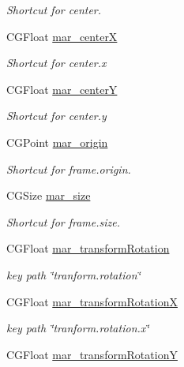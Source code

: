\begin{DoxyCompactItemize}
\begin{DoxyCompactList}\small\item\em Shortcut for center. \end{DoxyCompactList}\item 
C\+G\+Float \hyperlink{category_c_a_layer_07_m_a_r_e_x_08_a261ba297c811f16fe65b93b3bc4608a6}{mar\+\_\+centerX}
\begin{DoxyCompactList}\small\item\em Shortcut for center.\+x \end{DoxyCompactList}\item 
C\+G\+Float \hyperlink{category_c_a_layer_07_m_a_r_e_x_08_a0faae21d9b9cc323a0e0429fefb61539}{mar\+\_\+centerY}
\begin{DoxyCompactList}\small\item\em Shortcut for center.\+y \end{DoxyCompactList}\item 
C\+G\+Point \hyperlink{category_c_a_layer_07_m_a_r_e_x_08_a258dae76239e37400e6ff82cd06aa37a}{mar\+\_\+origin}
\begin{DoxyCompactList}\small\item\em Shortcut for frame.\+origin. \end{DoxyCompactList}\item 
C\+G\+Size \hyperlink{category_c_a_layer_07_m_a_r_e_x_08_a0c9bb9818b9801d38475ff7c0c75044a}{mar\+\_\+size}
\begin{DoxyCompactList}\small\item\em Shortcut for frame.\+size. \end{DoxyCompactList}\item 
C\+G\+Float \hyperlink{category_c_a_layer_07_m_a_r_e_x_08_a4ba4db24b6cb4a922561e311c41a94f2}{mar\+\_\+transform\+Rotation}
\begin{DoxyCompactList}\small\item\em key path \char`\"{}tranform.\+rotation\char`\"{} \end{DoxyCompactList}\item 
C\+G\+Float \hyperlink{category_c_a_layer_07_m_a_r_e_x_08_add4a8acf36f5f3e6d74ad4bd9176270c}{mar\+\_\+transform\+RotationX}
\begin{DoxyCompactList}\small\item\em key path \char`\"{}tranform.\+rotation.\+x\char`\"{} \end{DoxyCompactList}\item 
C\+G\+Float \hyperlink{category_c_a_layer_07_m_a_r_e_x_08_ade374c0a65c9bec9d7183f7c88e06fdd}{mar\+\_\+transform\+RotationY}

\end{DoxyCompactItemize}

